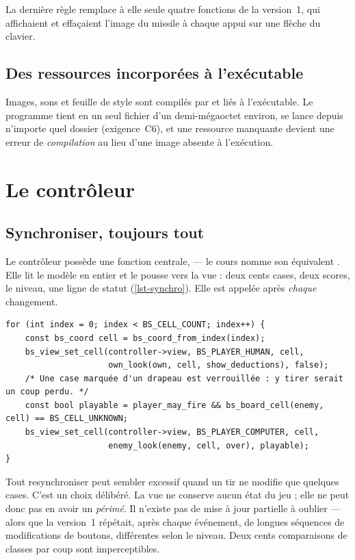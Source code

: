 La dernière règle remplace à elle seule quatre fonctions de la version~1, qui affichaient
et effaçaient l'image du missile à chaque appui sur une flèche du clavier.

\subsection{Des ressources incorporées à l'exécutable}

Images, sons et feuille de style sont compilés par  et liés à
l'exécutable. Le programme tient en un seul fichier d'un demi-mégaoctet environ, se lance depuis
n'importe quel dossier (exigence~C6), et une ressource manquante devient une erreur de
\emph{compilation} au lieu d'une image absente à l'exécution.

\section{Le contrôleur}

\subsection{Synchroniser, toujours tout}

Le contrôleur possède une fonction centrale,  --- le cours nomme son
équivalent . Elle lit le modèle en entier et le pousse
vers la vue :
deux cents cases, deux scores, le niveau, une ligne de statut (\cref{lst-synchro}). Elle est
appelée après \emph{chaque} changement.

\begin{lstlisting}[basicstyle=\ttfamily\footnotesize,
                   caption={Le cœur de la synchronisation (\fichier{src/ui/controller.c}).},
                   label={lst-synchro}]
for (int index = 0; index < BS_CELL_COUNT; index++) {
    const bs_coord cell = bs_coord_from_index(index);
    bs_view_set_cell(controller->view, BS_PLAYER_HUMAN, cell,
                     own_look(own, cell, show_deductions), false);
    /* Une case marquée d'un drapeau est verrouillée : y tirer serait un coup perdu. */
    const bool playable = player_may_fire && bs_board_cell(enemy, cell) == BS_CELL_UNKNOWN;
    bs_view_set_cell(controller->view, BS_PLAYER_COMPUTER, cell,
                     enemy_look(enemy, cell, over), playable);
}
\end{lstlisting}

Tout resynchroniser peut sembler excessif quand un tir ne modifie que quelques cases. C'est
un choix délibéré. La vue ne conserve aucun état du jeu ; elle ne peut donc pas en avoir un
\emph{périmé}. Il n'existe pas de mise à jour partielle à oublier --- alors que la
version~1 répétait, après chaque événement, de longues séquences de modifications de
boutons, différentes selon le niveau. Deux cents comparaisons de classes par coup sont
imperceptibles.

